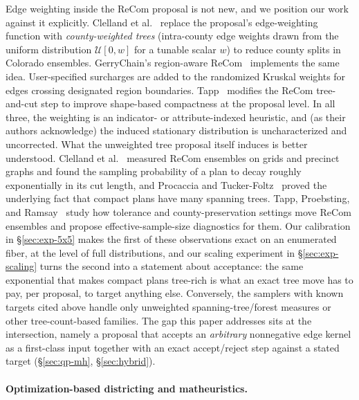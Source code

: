 \documentclass[11pt]{article}
\begin{document}
Edge weighting inside the ReCom proposal is not new, and we position
our work against it explicitly. Clelland et
al.~\cite{clelland2022colorado} replace the proposal's edge-weighting
function with \emph{county-weighted trees} (intra-county edge
weights drawn from the uniform distribution $\mathcal{U}[0, w]$ for a
tunable scalar $w$) to reduce county splits in Colorado ensembles.
GerryChain's region-aware ReCom~\cite{gerrychain2024} implements the
same idea. User-specified surcharges are added to the randomized
Kruskal weights for edges crossing designated region boundaries.
Tapp~\cite{tapp2025compactness} modifies the ReCom tree-and-cut step
to improve shape-based compactness at the proposal level. In all
three, the weighting is an indicator- or attribute-indexed heuristic,
and (as their authors acknowledge) the induced stationary distribution
is uncharacterized and uncorrected. What the unweighted tree proposal
itself induces is better understood. Clelland et
al.~\cite{clelland2021compactness} measured ReCom ensembles on grids
and precinct graphs and found the sampling probability of a plan to
decay roughly exponentially in its cut length, and Procaccia and
Tucker-Foltz~\cite{procaccia2022compact} proved the underlying fact
that compact plans have many spanning trees. Tapp, Proebsting, and
Ramsay~\cite{tapp2025parameter} study how tolerance and
county-preservation settings move ReCom ensembles and propose
effective-sample-size diagnostics for them. Our calibration in
\S\ref{sec:exp-5x5} makes the first of these observations exact on an
enumerated fiber, at the level of full distributions, and our scaling
experiment in \S\ref{sec:exp-scaling} turns the second into a
statement about acceptance: the same exponential that makes compact
plans tree-rich is what an exact tree move has to pay, per proposal,
to target anything else. Conversely, the samplers with known targets
cited above handle only unweighted spanning-tree/forest measures or
other tree-count-based families. The gap this paper addresses sits at
the intersection, namely a proposal that accepts an \emph{arbitrary}
nonnegative edge kernel as a first-class input together with an exact
accept/reject step against a stated target (\S\ref{sec:qp-mh},
\S\ref{sec:hybrid}).

\paragraph{Optimization-based districting and matheuristics.}\label{sec:related-opt}
\end{document}
